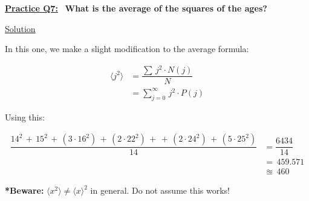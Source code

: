 
\underline{\textbf{Practice Q7:}} \ \textbf{What is the average of the squares of the ages?}

\bigskip

\underline{Solution}

In this one, we make a slight modification to the average formula:

\begin{align*}
    \langle j^{2} \rangle &= \dfrac{\sum \, j^{2} \cdot N(j)}{N} \\[1.5ex]
    &= \sum_{j=0}^{\infty} \, j{^2} \cdot P(j)
\end{align*}

Using this:

\begin{align*}
    \dfrac{14^{2} \, + \, 15^{2} \, + \, (3 \cdot 16^{2}) \, + \, (2 \cdot 22^{2}) \, + \,
    + \, (2 \cdot 24^{2}) \, + \, (5 \cdot 25^{2})}{14} &= \dfrac{6434}{14} \\[1.5ex]
    &= \, 459.571 \\[1.5ex]
    &\approxeq \, \boxed{460}
\end{align*}

\bigskip

\textbf{*Beware:} $ \langle x^{2} \rangle \neq \langle x \rangle^{2}$ in general. Do not assume this works!